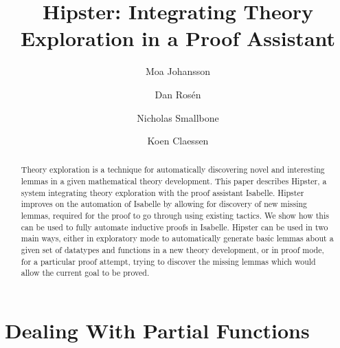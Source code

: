 \documentclass{llncs}
\begin{document}
\title{Hipster: Integrating Theory Exploration in a Proof Assistant}

\author{Moa Johansson \and Dan Ros\'en \and Nicholas Smallbone \and Koen Claessen}


\maketitle

\begin{abstract}
Theory exploration is a technique for automatically discovering novel and interesting lemmas in a given mathematical theory development. This paper describes Hipster, a system integrating theory exploration with the proof assistant Isabelle.
Hipster improves on the automation of Isabelle by allowing for discovery of new missing lemmas, required for the proof to go through using existing tactics. We show how this can be used to fully automate inductive proofs in Isabelle.
Hipster can be used in two main ways, either in exploratory mode to automatically generate basic lemmas about a given set of datatypes and functions in a new theory development, or in proof mode, for a particular proof attempt, trying to discover the missing lemmas which would allow the current goal to be proved. 

\end{abstract}







\section{Dealing With Partial Functions}
\label{sec:partial}









\end{document}
